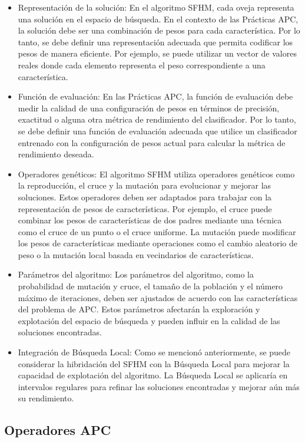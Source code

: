 \begin{itemize}
	\item Representación de la solución: En el algoritmo SFHM, cada oveja representa una solución en el espacio de búsqueda. En el contexto de las Prácticas APC, la solución debe ser una combinación de pesos para cada característica. Por lo tanto, se debe definir una representación adecuada que permita codificar los pesos de manera eficiente. Por ejemplo, se puede utilizar un vector de valores reales donde cada elemento representa el peso correspondiente a una característica.
	\item Función de evaluación: En las Prácticas APC, la función de evaluación debe medir la calidad de una configuración de pesos en términos de precisión, exactitud o alguna otra métrica de rendimiento del clasificador. Por lo tanto, se debe definir una función de evaluación adecuada que utilice un clasificador entrenado con la configuración de pesos actual para calcular la métrica de rendimiento deseada.
	\item Operadores genéticos: El algoritmo SFHM utiliza operadores genéticos como la reproducción, el cruce y la mutación para evolucionar y mejorar las soluciones. Estos operadores deben ser adaptados para trabajar con la representación de pesos de características. Por ejemplo, el cruce puede combinar los pesos de características de dos padres mediante una técnica como el cruce de un punto o el cruce uniforme. La mutación puede modificar los pesos de características mediante operaciones como el cambio aleatorio de peso o la mutación local basada en vecindarios de características.
	\item Parámetros del algoritmo: Los parámetros del algoritmo, como la probabilidad de mutación y cruce, el tamaño de la población y el número máximo de iteraciones, deben ser ajustados de acuerdo con las características del problema de APC. Estos parámetros afectarán la exploración y explotación del espacio de búsqueda y pueden influir en la calidad de las soluciones encontradas.
	\item Integración de Búsqueda Local: Como se mencionó anteriormente, se puede considerar la hibridación del SFHM con la Búsqueda Local para mejorar la capacidad de explotación del algoritmo. La Búsqueda Local se aplicaría en intervalos regulares para refinar las soluciones encontradas y mejorar aún más su rendimiento.
\end{itemize}

\subsection{Operadores APC}

